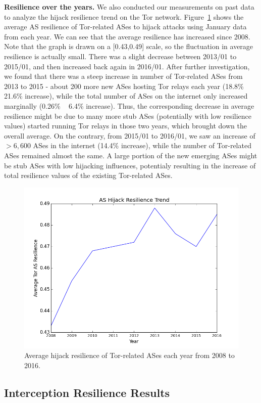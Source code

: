 {\bf Resilience over the years.} We also conducted our measurements on past data to analyze the hijack resilience trend on the Tor network.  Figure~\ref{fig:resilience_trend} shows the average AS resilience of Tor-related ASes to hijack attacks using January data from each year.  We can see that the average resilience has increased since 2008.  Note that the graph is drawn on a [0.43,0.49] scale, so the fluctuation in average resilience is actually small. There was a slight decrease between 2013/01 to 2015/01, and then increased back again in 2016/01. After further investigation, we found that there was a steep increase in number of Tor-related ASes from 2013 to 2015 - about 200 more new ASes hosting Tor relays each year (18.8\% ~ 21.6\% increase), while the total number of ASes on the internet only increased marginally (0.26\% ~ 6.4\% increase). Thus, the corresponding decrease in average resilience might be due to many more stub ASes (potentially with low resilience values) started running Tor relays in those two years, which brought down the overall average. On the contrary, from 2015/01 to 2016/01, we saw an increase of $>6,600$ ASes in the internet (14.4\% increase), while the number of Tor-related ASes remained almost the same. A large portion of the new emerging ASes might be stub ASes with low hijacking influences, potentialy resulting in the increase of total resilience values of the existing Tor-related ASes. 

\begin{figure}[ht!]
\centering
\includegraphics[width=.4\textwidth]{hijack_resilience_trend}
\caption{Average hijack resilience of Tor-related ASes each year from 2008 to 2016.}
\label{fig:resilience_trend}
\end{figure}

\subsection{Interception Resilience Results}

